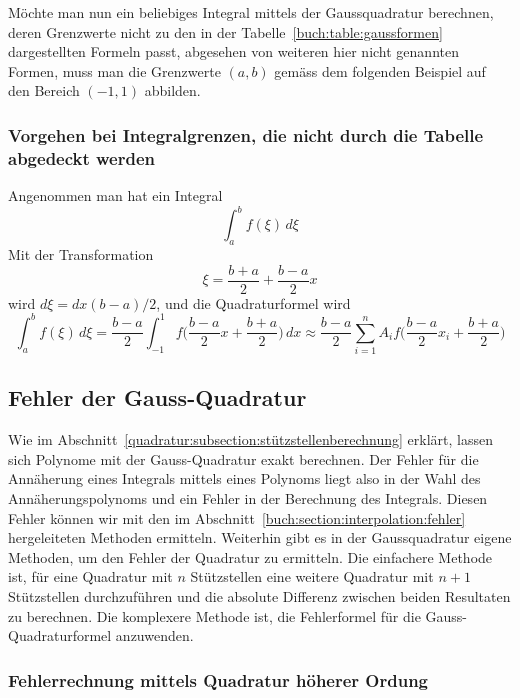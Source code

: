 Möchte man nun ein beliebiges Integral mittels der Gaussquadratur berechnen,
deren Grenzwerte nicht zu den in der Tabelle~\ref{buch:table:gaussformen} 
dargestellten Formeln passt, 
abgesehen von weiteren hier nicht genannten Formen, 
muss man die Grenzwerte $(a, b)$ gemäss dem folgenden Beispiel
auf den Bereich $(-1, 1)$ abbilden.

\subsubsection{Vorgehen bei Integralgrenzen, die nicht durch die Tabelle abgedeckt werden}

Angenommen man hat ein Integral
\begin{equation}
    \int_{a}^{b}f(\xi)\,d\xi
\end{equation}
Mit der Transformation
\begin{equation}
    \xi = \frac{b + a}{2} + \frac{b - a}{2} x    
\end{equation}
wird $d\xi = dx(b - a)/2$, und die Quadraturformel wird
\begin{equation}
    \int_{a}^{b}f(\xi)\,d\xi 
    =
    \frac{b - a}{2} \int_{-1}^{1}f\bigg(\frac{b - a}{2}x + \frac{b + a}{2}\bigg)\, dx 
    \approx
     \frac{b - a}{2} \sum_{i=1}^{n} A_{i}f\bigg(\frac{b - a}{2}x_{i} + \frac{b + a}{2}\bigg)
\end{equation}

\subsection{Fehler der Gauss-Quadratur
\label{quadratur:subsection:gaussfehler}}
Wie im Abschnitt~\ref{quadratur:subsection:stützstellenberechnung} erklärt,
lassen sich Polynome mit der Gauss-Quadratur exakt berechnen. 
Der Fehler für die Annäherung eines Integrals mittels eines Polynoms liegt
also in der Wahl des Annäherungspolynoms und ein Fehler in der Berechnung des Integrals.
Diesen Fehler können wir mit den im Abschnitt~\ref{buch:section:interpolation:fehler}
hergeleiteten Methoden ermitteln.
Weiterhin gibt es in der Gaussquadratur eigene Methoden, 
um den Fehler der Quadratur zu ermitteln. 
Die einfachere Methode ist, für eine Quadratur mit $n$ Stützstellen eine weitere
Quadratur mit $n+1$ Stützstellen durchzuführen und die absolute Differenz
zwischen beiden Resultaten zu berechnen. 
Die komplexere Methode ist, 
die Fehlerformel für die Gauss-Quadraturformel anzuwenden. 

\subsubsection{Fehlerrechnung mittels Quadratur höherer Ordung}

